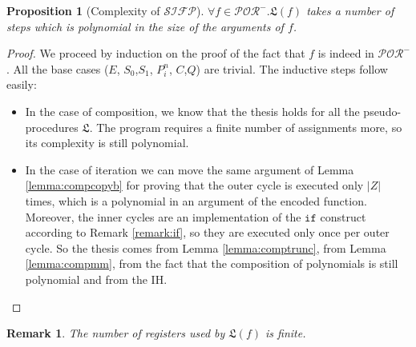 \documentclass[10pt]{amsart}
\newcommand{\POR}{\mathcal{POR}}
\newcommand{\SIFP}{\mathcal{SIFP}}
\newcommand{\If}{\mathtt{if}}
\newcommand{\LL}{\mathfrak L}
\newtheorem{prop}{Proposition}
\newtheorem{remark}{Remark}
\begin{document}
\begin{prop}[Complexity of $\SIFP$]
$\forall f \in \POR^-. \LL(f)$ takes a number of steps which is polynomial in the size of the arguments of $f$.
\end{prop}
\begin{proof}
We proceed by induction on the proof of the fact that $f$ is indeed in $\POR^-$. All the base cases ($E$, $S_0$,$S_1$, ${P}^n_i$, $C$,$Q$) are trivial. The inductive steps follow easily:
\begin{itemize}
\item In the case of composition, we know that the thesis holds for all the pseudo-procedures $\LL$. The program requires a finite number of assignments more, so its complexity is still polynomial.
\item In the case of iteration we can move the same argument of Lemma \ref{lemma:compcopyb} for proving that the outer cycle is executed only $|Z|$ times, which is a polynomial in an argument of the encoded function. Moreover, the inner cycles are an implementation of the $\If$ construct according to Remark \ref{remark:if}, so they are executed only once per outer cycle. So the thesis comes from Lemma \ref{lemma:comptrunc}, from Lemma \ref{lemma:compmm}, from the fact that the composition of polynomials is still polynomial and from the IH.
\end{itemize}
\end{proof}

\begin{remark}
The number of registers used by $\LL(f)$ is finite.
\end{remark}
\end{document}

